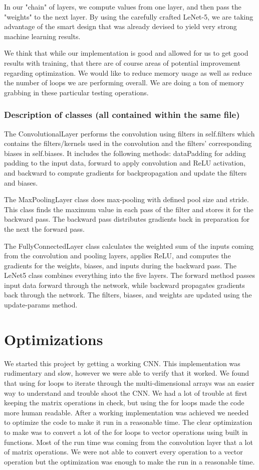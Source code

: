 \documentclass{article}
\begin{document}
In our "chain" of layers, we compute values from one layer, and then pass the "weights" to the next layer. By using the carefully crafted LeNet-5, we are taking advantage of the smart design that was already devised to yield very strong machine learning results.

We think that while our implementation is good and allowed for us to get good results with training, that there are of course areas of potential improvement regarding optimization. We would like to reduce memory usage as well as reduce the number of loops we are performing overall. We are doing a ton of memory grabbing in these particular testing operations.

\subsubsection*{Description of classes (all contained within the same file)}
The ConvolutionalLayer performs the convolution using filters in self.filters which contains the filters/kernels used in the convolution and the filters' corresponding biases in self.biases. It includes the following methods: dataPadding for adding padding to the input data, forward to apply convolution and ReLU activation, and backward to compute gradients for backpropagation and update the filters and biases. 

The MaxPoolingLayer class does max-pooling with defined pool size and stride. This class finds the maximum value in each pass of the filter and stores it for the backward pass. The backward pass distributes gradients back in preparation for the next the forward pass.

The FullyConnectedLayer class calculates the weighted sum of the inputs coming from the convolution and pooling layers, applies ReLU, and computes the gradients for the weights, biases, and inputs during the backward pass. The LeNet5 class combines everything into the five layers. The forward method passes input data forward through the network, while backward propagates gradients back through the network. The filters, biases, and weights are updated using the update-params method.

\section{Optimizations}
We started this project by getting a working CNN. This implementation was rudimentary and slow, however we were able to verify that it worked. We found that using for loops to iterate through the multi-dimensional arrays was an easier way to understand and trouble shoot the CNN. We had a lot of trouble at first keeping the matrix operations in check, but using the for loops made the code more human readable. After a working implementation was achieved we needed to optimize the code to make it run in a reasonable time. The clear optimization to make was to convert a lot of the for loops to vector operations using built in functions. Most of the run time was coming from the convolution layer that a lot of matrix operations. We were not able to convert every operation to a vector operation but the optimization was enough to make the run in a reasonable time. 
\end{document}
